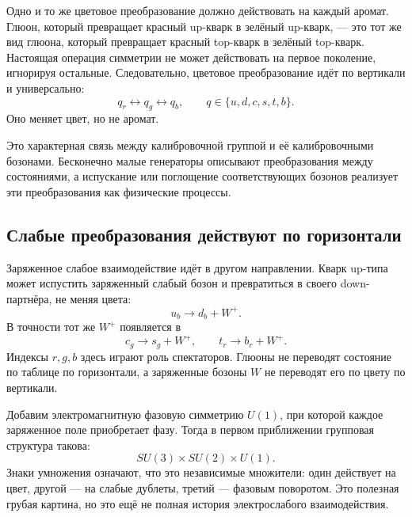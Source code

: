 Одно и то же цветовое преобразование должно действовать на каждый аромат. Глюон, который превращает красный up-кварк в зелёный up-кварк, — это тот же вид глюона, который превращает красный top-кварк в зелёный top-кварк. Настоящая операция симметрии не может действовать на первое поколение, игнорируя остальные. Следовательно, цветовое преобразование идёт по вертикали и универсально:
\begin{equation}
  q_r\longleftrightarrow q_g\longleftrightarrow q_b,
  \qquad q\in\{u,d,c,s,t,b\}.
\end{equation}
Оно меняет цвет, но не аромат.

Это характерная связь между калибровочной группой и её калибровочными бозонами. Бесконечно малые генераторы описывают преобразования между состояниями, а испускание или поглощение соответствующих бозонов реализует эти преобразования как физические процессы.

\subsection{Слабые преобразования действуют по горизонтали}

Заряженное слабое взаимодействие идёт в другом направлении. Кварк up-типа может испустить заряженный слабый бозон и превратиться в своего down-партнёра, не меняя цвета:
\begin{equation}
  u_b\longrightarrow d_b+W^+.
\end{equation}
В точности тот же \(W^+\) появляется в
\begin{equation}
  c_g\longrightarrow s_g+W^+,
  \qquad
  t_r\longrightarrow b_r+W^+.
\end{equation}
Индексы \(r,g,b\) здесь играют роль спектаторов. Глюоны не переводят состояние по таблице по горизонтали, а заряженные бозоны \(W\) не переводят его по цвету по вертикали.

Добавим электромагнитную фазовую симметрию \(U(1)\), при которой каждое заряженное поле приобретает фазу. Тогда в первом приближении групповая структура такова:
\begin{equation}
  SU(3)\times SU(2)\times U(1).
\end{equation}
Знаки умножения означают, что это независимые множители: один действует на цвет, другой — на слабые дублеты, третий — фазовым поворотом. Это полезная грубая картина, но это ещё не полная история электрослабого взаимодействия.

